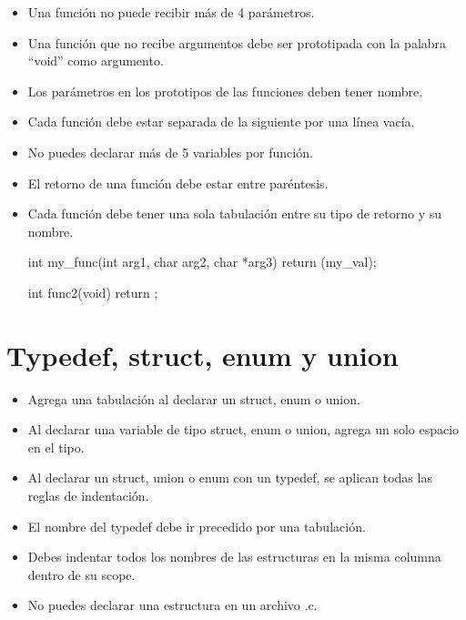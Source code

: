 \documentclass{42-es}
\begin{document}
\begin{itemize}

      \item Una función no puede recibir más de 4 parámetros.
      \item Una función que no recibe argumentos debe ser prototipada con la
            palabra ``void'' como argumento.
      \item Los parámetros en los prototipos de las funciones deben tener
            nombre.
      \item Cada función debe estar separada de la siguiente por una línea
            vacía.
      \item No puedes declarar más de 5 variables por función.
      \item El retorno de una función debe estar entre paréntesis.
      \item Cada función debe tener una sola tabulación entre su tipo de
            retorno
            y
            su nombre.

            \begin{42ccode}
                  int my_func(int arg1, char arg2, char *arg3)
                  {
                              return (my_val);
                        }

                  int func2(void)
                  {
                              return ;
                        }
            \end{42ccode}
\end{itemize}
\newpage

\section{Typedef, struct, enum y union}

\begin{itemize}
      \item Agrega una tabulación al declarar un struct, enum o union.
      \item Al declarar una variable de tipo struct, enum o union, agrega un
            solo
            espacio en el tipo.
      \item Al declarar un struct, union o enum con un typedef, se aplican
            todas
            las reglas de indentación.
      \item El nombre del typedef debe ir precedido por una tabulación.
      \item Debes indentar todos los nombres de las estructuras en la misma
            columna dentro de su scope.
      \item No puedes declarar una estructura en un archivo .c.
\end{itemize}
\newpage
\end{document}

